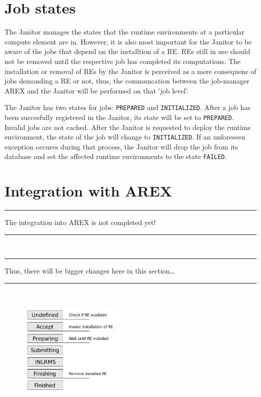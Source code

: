 

\section{Job states}

The Janitor manages the states that the runtime environments at a particular
compute element are in. However, it is also most important for the Janitor
to be aware of the jobs that depend on the installtion of a RE. REs still in use
should not be removed until the respective job has completed its computations.
The installation or removal of REs by the Janitor is perceived as a mere
consequene of jobs demanding a RE or not, thus, the communcation between
the job-manager AREX and the Janitor will be performed on that 'job level'.

The Janitor has two states for jobs: \texttt{PREPARED} and \texttt{INITIALIZED}. After a job has been succesfully registered 
in the Janitor, its state will be set to \texttt{PREPARED}. Invalid jobs are not cached. 
After the Janitor is requested to deploy the runtime environment, the state of the job will change to \texttt{INITIALIZED}. If 
an unforeseen exception occures during that process, the Janitor will drop the job from its database and set the affected runtime
environments to the state \texttt{FAILED}.

\section{Integration with AREX}


\newenvironment{note}
{\rule{1ex}{1ex}\hspace{\stretch{1}}}
{\rule{1ex}{1ex}\\}
\begin{note}
The integration into AREX is not completed yet!
\end{note}
\begin{note}
Thus, there will be bigger changes here in this section\dots
\end{note}


\begin{figure}[!h]
  \begin{center}
    \includegraphics[width=5cm]{images/arex-stages.pdf}
    \mycaption{}{}
    \label{fig:RE_states}
  \end{center}
\end{figure}

